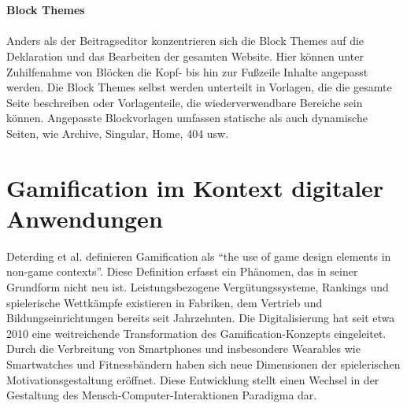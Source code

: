 \\\\
\textbf{Block Themes}
\\\\
Anders als der Beitragseditor konzentrieren sich die Block Themes auf die Deklaration und das Bearbeiten der gesamten Website.
Hier können unter Zuhilfenahme von Blöcken die Kopf- bis hin zur Fußzeile Inhalte angepasst werden.
Die Block Themes selbst werden unterteilt in Vorlagen, die die gesamte Seite beschreiben oder Vorlagenteile, die wiederverwendbare Bereiche sein können.
Angepasste Blockvorlagen umfassen statische als auch dynamische Seiten, wie Archive, Singular, Home, 404 usw. \cite{wordpress2024EditorTemplates}


\section{Gamification im Kontext digitaler Anwendungen}

Deterding et al. definieren Gamification als ``the use of game design elements in non-game contexts''. \cite{deterding2011gamification}
Diese Definition erfasst ein Phänomen, das in seiner Grundform nicht neu ist.
Leistungsbezogene Vergütungssysteme, Rankings und spielerische Wettkämpfe existieren in Fabriken, dem Vertrieb und Bildungseinrichtungen bereits seit Jahrzehnten. \cite{bpb2023gamification}
Die Digitalisierung hat seit etwa 2010 eine weitreichende Transformation des Gamification-Konzepts eingeleitet.
Durch die Verbreitung von Smartphones und insbesondere Wearables wie Smartwatches und Fitnessbändern haben sich neue Dimensionen der spielerischen Motivationsgestaltung eröffnet. \cite{sailer2016gamification}
Diese Entwicklung stellt einen Wechsel in der Gestaltung des Mensch-Computer-Interaktionen Paradigma dar.

